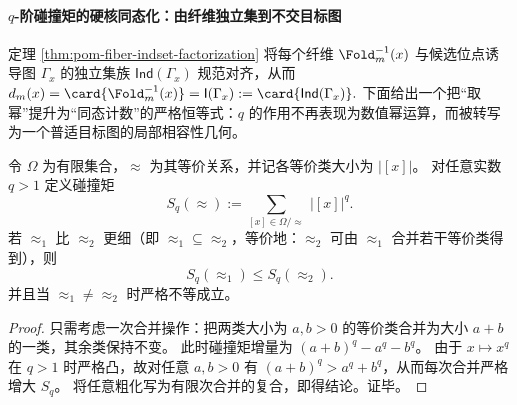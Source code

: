 
\paragraph{\texorpdfstring{$q$}{q}-阶碰撞矩的硬核同态化：由纤维独立集到不交目标图}
定理 \ref{thm:pom-fiber-indset-factorization} 将每个纤维 \(\Fold_m^{-1}(x)\) 与候选位点诱导图 \(\Gamma_x\) 的独立集族 \(\mathsf{Ind}(\Gamma_x)\) 规范对齐，从而
\(
d_m(x)=\card{\Fold_m^{-1}(x)}=\mathsf{I}(\Gamma_x)
:=\card{\mathsf{Ind}(\Gamma_x)}.
\)
下面给出一个把“取幂”提升为“同态计数”的严格恒等式：\(q\) 的作用不再表现为数值幂运算，而被转写为一个普适目标图的局部相容性几何。

\begin{proposition}[粗粒化下的碰撞矩严格单调律]\label{prop:pom-coarsegraining-collision-moment-strict-monotonicity}
令 \(\Omega\) 为有限集合，\(\approx\) 为其等价关系，并记各等价类大小为 \(|[x]|\)。
对任意实数 \(q>1\) 定义碰撞矩
\[
S_q(\approx):=\sum_{[x]\in \Omega/\!\approx}\ |[x]|^{q}.
\]
若 \(\approx_1\) 比 \(\approx_2\) 更细（即 \(\approx_1\subseteq \approx_2\)，等价地：\(\approx_2\) 可由 \(\approx_1\) 合并若干等价类得到），则
\[
\boxed{\;
S_q(\approx_1)\le S_q(\approx_2).\;}
\]
并且当 \(\approx_1\neq \approx_2\) 时严格不等成立。
\end{proposition}
\begin{proof}
只需考虑一次合并操作：把两类大小为 \(a,b>0\) 的等价类合并为大小 \(a+b\) 的一类，其余类保持不变。
此时碰撞矩增量为
\(
(a+b)^q-a^q-b^q
\)。
由于 \(x\mapsto x^q\) 在 \(q>1\) 时严格凸，故对任意 \(a,b>0\) 有 \((a+b)^q>a^q+b^q\)，从而每次合并严格增大 \(S_q\)。
将任意粗化写为有限次合并的复合，即得结论。证毕。
\end{proof}

